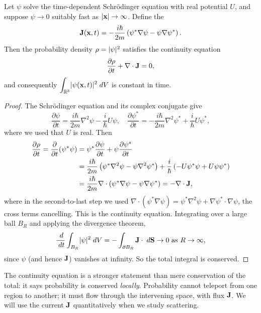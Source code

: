 \documentclass[a4paper]{scrartcl}
\begin{document}
\begin{theorem}
    Let $\psi$ solve the time-dependent Schr\"odinger equation with real potential $U$, and suppose $\psi \rightarrow 0$ suitably fast as $\lvert\mathbf{x}\rvert \rightarrow \infty$. Define the 
    $$
    \mathbf{J}(\mathbf{x}, t) = -\frac{i \hbar}{2m} \left( \psi^* \nabla \psi - \psi \nabla \psi^* \right).
    $$
    Then the probability density $\rho = \lvert\psi\rvert^2$ satisfies the continuity equation
    $$
    \frac{\partial \rho}{\partial t} + \nabla \cdot \mathbf{J} = 0,
    $$
    and consequently $\displaystyle \int_{\mathbb{R}^3} \lvert\psi(\mathbf{x},t)\rvert^2 \; d V$ is constant in time.
\end{theorem}
\begin{proof}
    The Schr\"odinger equation and its complex conjugate give
    $$
    \frac{\partial \psi}{\partial t} = \frac{i \hbar}{2m} \nabla^2 \psi - \frac{i}{\hbar} U \psi, \quad
    \frac{\partial \psi^*}{\partial t} = -\frac{i \hbar}{2m} \nabla^2 \psi^* + \frac{i}{\hbar} U \psi^*,
    $$
    where we used that $U$ is real. Then
    \begin{align*}
        \frac{\partial \rho}{\partial t} = \frac{\partial}{\partial t} (\psi^* \psi)
        &= \psi^* \frac{\partial \psi}{\partial t} + \psi \frac{\partial \psi^*}{\partial t} \\
        &= \frac{i\hbar}{2m} \left( \psi^* \nabla^2 \psi - \psi \nabla^2 \psi^* \right) + \frac{i}{\hbar}\left(- U \psi^* \psi + U \psi \psi^* \right)\\
        &= \frac{i\hbar}{2m} \nabla \cdot \left( \psi^* \nabla \psi - \psi \nabla \psi^* \right) = -\nabla \cdot \mathbf{J},
    \end{align*}
    where in the second-to-last step we used $\nabla \cdot (\psi^* \nabla \psi) = \psi^* \nabla^2 \psi + \nabla \psi^* \cdot \nabla \psi$, the cross terms cancelling. This is the continuity equation. Integrating over a large ball $B_R$ and applying the divergence theorem,
    $$
    \frac{\; d}{\; d t} \int_{B_R} \lvert\psi\rvert^2 \; d V = -\int_{\partial B_R} \mathbf{J} \cdot \; d \mathbf{S} \rightarrow 0 \text{ as } R \rightarrow \infty,
    $$
    since $\psi$ (and hence $\mathbf{J}$) vanishes at infinity. So the total integral is conserved.
\end{proof}

The continuity equation is a stronger statement than mere conservation of the total: it says probability is conserved \emph{locally}. Probability cannot teleport from one region to another; it must flow through the intervening space, with flux $\mathbf{J}$. We will use the current $\mathbf{J}$ quantitatively when we study scattering.
\end{document}
